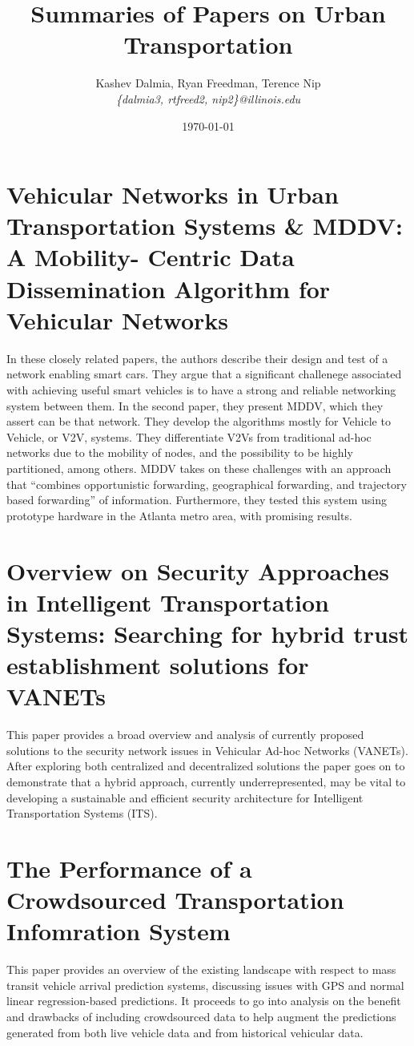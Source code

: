 \documentclass[a4paper]{article}
\title{Summaries of Papers on Urban Transportation}
\author{Kashev Dalmia, Ryan Freedman, Terence Nip \\
        \textit{\{dalmia3, rtfreed2, nip2\}@illinois.edu}
       }
\date{\today}
\begin{document}
\maketitle

\section{Vehicular Networks in Urban Transportation Systems \& MDDV: A Mobility-
Centric Data Dissemination Algorithm for Vehicular Networks}

In these closely related papers, the authors describe their design and test of a
network enabling smart cars. They argue that a significant challenege associated
with achieving useful smart vehicles is to have a strong and reliable networking
system between them. In the second paper, they present MDDV, which they assert
can be that network. They develop the algorithms mostly for Vehicle to Vehicle,
or V2V, systems. They differentiate V2Vs from traditional ad-hoc networks due to
the mobility of nodes, and the possibility to be highly partitioned, among
others. MDDV takes on these challenges with an approach that ``combines
opportunistic forwarding, geographical forwarding, and trajectory based
forwarding'' of information. Furthermore, they tested this system using
prototype hardware in the Atlanta metro area, with promising results.

\section{Overview on Security Approaches in Intelligent Transportation Systems:
Searching for hybrid trust establishment solutions for VANETs}

This paper provides a broad overview and analysis of currently proposed
solutions to the security network issues in Vehicular Ad-hoc Networks (VANETs).
After exploring both centralized and decentralized solutions the paper goes on
to demonstrate that a hybrid approach, currently underrepresented, may be vital
to developing a sustainable and efficient security architecture for Intelligent
Transportation Systems (ITS).

\section{The Performance of a Crowdsourced Transportation Infomration System}

This paper provides an overview of the existing landscape with respect to mass
transit vehicle arrival prediction systems, discussing issues with GPS and
normal linear regression-based predictions. It proceeds to go into analysis on
the benefit and drawbacks of including crowdsourced data to help augment the
predictions generated from both live vehicle data and from historical vehicular
data.
\end{document}
